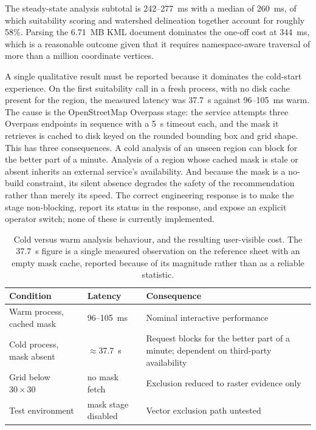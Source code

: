 \documentclass[sigconf,review,10pt]{acmart}
\begin{document}
The steady-state analysis subtotal is 242--277~ms with a median of
260~ms, of which suitability scoring and watershed delineation together
account for roughly 58\%. Parsing the 6.71~MB KML document dominates the
one-off cost at 344~ms, which is a reasonable outcome given that it
requires namespace-aware traversal of more than a million coordinate
vertices.

A single qualitative result must be reported because it dominates the
cold-start experience. On the first suitability call in a fresh process,
with no disk cache present for the region, the measured latency was
37.7~s against 96--105~ms warm. The cause is the OpenStreetMap Overpass
stage: the service attempts three Overpass endpoints in sequence with a
5~s timeout each, and the mask it retrieves is cached to disk keyed on the
rounded bounding box and grid shape. This has three consequences. A cold
analysis of an unseen region can block for the better part of a minute.
Analysis of a region whose cached mask is stale or absent inherits an
external service's availability. And because the mask is a no-build
constraint, its silent absence degrades the safety of the recommendation
rather than merely its speed. The correct engineering response is to make
the stage non-blocking, report its status in the response, and expose an
explicit operator switch; none of these is currently implemented.

\begin{table}[t]
\caption{Cold versus warm analysis behaviour, and the resulting
user-visible cost. The 37.7~s figure is a single measured observation on
the reference sheet with an empty mask cache, reported because of its
magnitude rather than as a reliable statistic.}
\label{tab:cold}
\small
\begin{tabular}{@{}R{4.4cm}R{3.4cm}R{8.7cm}@{}}
\toprule
\textbf{Condition} & \textbf{Latency} & \textbf{Consequence} \\
\midrule
Warm process, cached mask & 96--105~ms & Nominal interactive performance \\
Cold process, mask absent & $\approx$37.7~s & Request blocks for the better part of a minute; dependent on third-party availability \\
Grid below $30\times30$ & no mask fetch & Exclusion reduced to raster evidence only \\
Test environment & mask stage disabled & Vector exclusion path untested \\
\bottomrule
\end{tabular}
\end{table}
\end{document}
